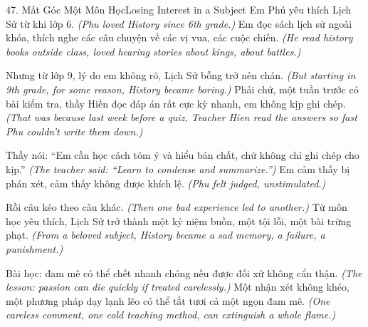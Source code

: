 \begin{truyen}{47. Mất Góc Một Môn Học}{Losing Interest in a Subject}
Em Phú yêu thích Lịch Sử từ khi lớp 6.
\textit{(Phu loved History since 6th grade.)}
Em đọc sách lịch sử ngoài khóa, thích nghe các câu chuyện về các vị vua, các cuộc chiến.
\textit{(He read history books outside class, loved hearing stories about kings, about battles.)}

Nhưng từ lớp 9, lý do em không rõ, Lịch Sử bỗng trở nên chán.
\textit{(But starting in 9th grade, for some reason, History became boring.)}
Phải chứ, một tuần trước có bài kiểm tra, thầy Hiền đọc đáp án rất cực kỳ nhanh, em không kịp ghi chép.
\textit{(That was because last week before a quiz, Teacher Hien read the answers so fast Phu couldn't write them down.)}

Thầy nói: ``Em cần học cách tóm ý và hiểu bản chất, chứ không chỉ ghi chép cho kịp.''
\textit{(The teacher said: ``Learn to condense and summarize.'')}
Em cảm thấy bị phán xét, cảm thấy không được khích lệ.
\textit{(Phu felt judged, unstimulated.)}

Rồi câu kéo theo câu khác.
\textit{(Then one bad experience led to another.)}
Từ môn học yêu thích, Lịch Sử trở thành một kỷ niệm buồn, một tội lỗi, một bài trừng phạt.
\textit{(From a beloved subject, History became a sad memory, a failure, a punishment.)}

Bài học: đam mê có thể chết nhanh chóng nếu được đối xử không cẩn thận.
\textit{(The lesson: passion can die quickly if treated carelessly.)}
Một nhận xét không khéo, một phương pháp dạy lạnh lẽo có thể tắt tươi cả một ngọn đam mê.
\textit{(One careless comment, one cold teaching method, can extinguish a whole flame.)}
\end{truyen}

